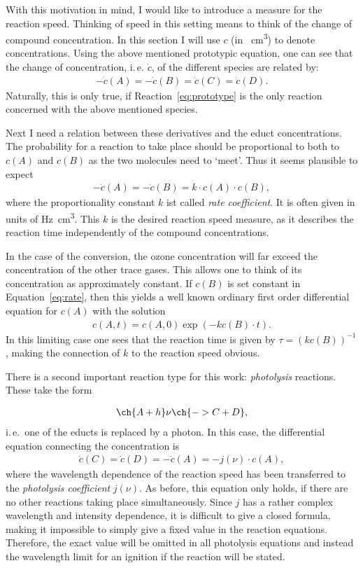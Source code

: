With this motivation in mind, I would like to introduce a measure for
the reaction speed. Thinking of speed in this setting means to think
of the change of compound concentration. In this section I will use
$c$ (in \si{\per\cubic\centi\meter}) to denote concentrations. Using
the above mentioned prototypic equation, one can see that the change
of concentration, i.\,e. $\dot c$, of the different species are
related by:
\begin{align*}
  -\dot c(A) = - \dot c(B) = \dot c(C) = \dot c(D).
\end{align*}
Naturally, this is only true, if Reaction~\eqref{eq:prototype} is the
only reaction concerned with the above mentioned species.

Next I need a relation between these derivatives and the educt
concentrations. The probability for a reaction to take place should be
proportional to both to $c(A)$ and $c(B)$ as the two molecules need to
`meet'. Thus it seems plausible to expect
\begin{align}
  -\dot c(A) = - \dot c(B) = k \cdot c(A) \cdot c(B), \label{eq:rate}
\end{align}
where the proportionality constant $k$ ist called \emph{rate
  coefficient}. It is often given in units of
\si{\hertz\cubic\centi\meter}. This $k$ is the desired reaction
speed measure, as it describes the
reaction time independently of the compound concentrations.

In the case of the conversion, the ozone concentration will far exceed
the concentration of the other trace gases. This allows one to think
of its concentration as approximately constant. If $c(B)$ is set
constant in Equation~\eqref{eq:rate}, then this yields a well known
ordinary first order differential equation for $c(A)$ with the
solution
\begin{align*}
  c(A,t) = c(A,0)\exp(-kc(B)\cdot t).
\end{align*}
In this limiting case one sees that the reaction time is given by $\tau =
(kc(B))^{-1}$, making the connection of $k$ to the reaction speed
obvious.

There is a second important reaction type for this work:
\emph{photolysis} reactions. These take the form

\begin{align}
  \ch{A + h}\nu \ch{-> C + D},
\end{align}
i.\,e.\ one of the educts is replaced by a photon. In this case, the
differential equation connecting the concentration is
\begin{align}
  \dot c(C) = \dot c(D) = -\dot c(A) = - j(\nu) \cdot c(A),
\end{align}
where the wavelength dependence of the reaction speed has been
transferred to the \emph{photolysis coefficient} $j(\nu)$. As before,
this equation only holds, if there are no other reactions taking place
simultaneously. Since $j$ has a rather complex wavelength and
intensity dependence, it is difficult to give a closed formula, making
it impossible to simply give a fixed value in the reaction
equations. Therefore, the exact value will be omitted in all photolysis
equations and instead the wavelength limit for an ignition if the
reaction will be stated.

